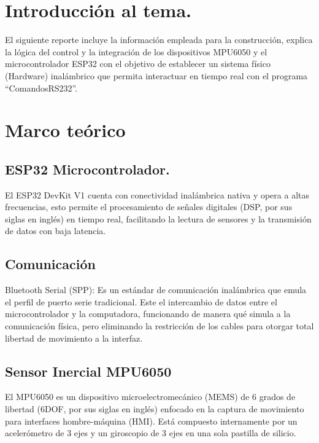 \documentclass[conference]{IEEEtran}
\begin{document}

\section{Introducción al tema.}
El siguiente reporte incluye la información empleada para la construcción, explica la lógica del control y la integración de los dispositivos MPU6050 \cite{invensense2013mpu6050} y el microcontrolador ESP32 con el objetivo de establecer un sistema físico (Hardware) inalámbrico que permita interactuar en tiempo real con el programa ``ComandosRS232''.

\section{Marco teórico}

  \subsection{ESP32 Microcontrolador.}
  El ESP32 DevKit V1 cuenta con conectividad inalámbrica nativa y opera a altas frecuencias, esto permite el procesamiento de señales digitales (DSP, por sus siglas en inglés) en tiempo real, facilitando la lectura de sensores y la transmisión de datos con baja latencia. \cite{espressif2023esp32}
  \subsection{Comunicación}
  Bluetooth Serial (SPP): Es un estándar de comunicación inalámbrica que emula el perfil de puerto serie tradicional. Este el intercambio de datos entre el microcontrolador y la computadora, funcionando de manera qué simula a la comunicación física, pero eliminando la restricción de los cables para otorgar total libertad de movimiento a la interfaz.
  \subsection{Sensor Inercial MPU6050}
  El MPU6050 es un dispositivo microelectromecánico (MEMS) de 6 grados de libertad (6DOF, por sus siglas en inglés) enfocado en la captura de movimiento para interfaces hombre-máquina (HMI). Está compuesto internamente por un acelerómetro de 3 ejes y un giroscopio de 3 ejes en una sola pastilla de silicio. \cite{invensense2013mpu6050}
\end{document}
